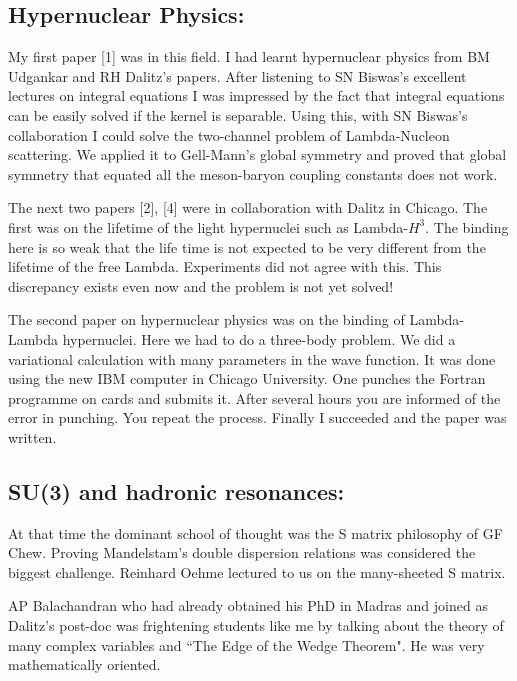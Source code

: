 \subsection*{Hypernuclear Physics:}

My first paper [1] was in this field. I had learnt hypernuclear physics 
from BM Udgankar and RH Dalitz's papers. After liste\-ning to SN Biswas's 
excellent lectures on integral equations I was impressed by the fact 
that integral equations can be easily solved if the kernel is separable. 
Using this, with SN Biswas's collaboration I could solve the two-channel 
problem of Lambda-Nucleon scattering. We applied it to Gell-Mann's 
global symmetry and proved that global symmetry that equated all the 
meson-baryon coupling constants does not work.

The next two papers [2], [4] were in collaboration with Dalitz in Chicago. 
The first was on the lifetime of the light hypernuclei such as 
Lambda-$H^3$. The binding here is so weak that the life time is not 
expected to be very different from the lifetime of the free Lambda. 
Experiments did not agree with this. This discre\-pancy exists even now 
and the problem is not yet solved!

The second paper on hypernuclear physics was on the bin\-ding of 
Lambda-Lambda hypernuclei. Here we had to do a three-body problem. We 
did a variational calculation with many para\-meters in the wave function. 
It was done using the new IBM computer in Chicago University. One 
punches the Fortran programme on cards and submits it. After several 
hours you are informed of the error in punching. You repeat the process. 
Finally I succeeded and the paper was written.

\vspace{-\topsep}
\subsection*{SU(3) and hadronic resonances:}

At that time the dominant school of thought was the S matrix philosophy 
of GF Chew. Proving Mandelstam's double dispersion relations was 
considered the biggest challenge. Reinhard Oehme lectured to us on the 
many-sheeted S matrix.

AP Balachandran who had already obtained his PhD in Mad\-ras and joined as 
Dalitz's post-doc was frightening students like me by talking about the 
theory of many complex variables and ``The Edge of the Wedge Theorem". He 
was very mathematically oriented.

